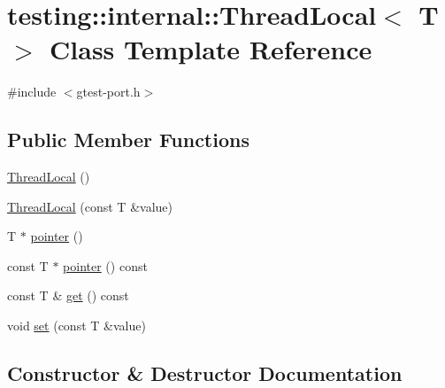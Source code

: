 \hypertarget{classtesting_1_1internal_1_1_thread_local}{}\section{testing\+:\+:internal\+:\+:Thread\+Local$<$ T $>$ Class Template Reference}
\label{classtesting_1_1internal_1_1_thread_local}


{\ttfamily \#include $<$gtest-\/port.\+h$>$}

\subsection*{Public Member Functions}
\begin{DoxyCompactItemize}
\item 
\hyperlink{classtesting_1_1internal_1_1_thread_local_a106f3a3ad15d08f95f9887105d2a1af5}{Thread\+Local} ()
\item 
\hyperlink{classtesting_1_1internal_1_1_thread_local_a85610bdfdbc93a4c56215e0aad7da870}{Thread\+Local} (const T \&value)
\item 
T $\ast$ \hyperlink{classtesting_1_1internal_1_1_thread_local_a882f57fed4b074de83693c0c0fe62858}{pointer} ()
\item 
const T $\ast$ \hyperlink{classtesting_1_1internal_1_1_thread_local_af4b33c12fd2da7d43d8654feccca77f7}{pointer} () const 
\item 
const T \& \hyperlink{classtesting_1_1internal_1_1_thread_local_a9cfa47ae6e9e8c19fe8782e2e9c1b13e}{get} () const 
\item 
void \hyperlink{classtesting_1_1internal_1_1_thread_local_ab5ebc7ba07426cef7167afa2a7707eb4}{set} (const T \&value)
\end{DoxyCompactItemize}


\subsection{Constructor \& Destructor Documentation}
\hypertarget{classtesting_1_1internal_1_1_thread_local_a106f3a3ad15d08f95f9887105d2a1af5}{}

